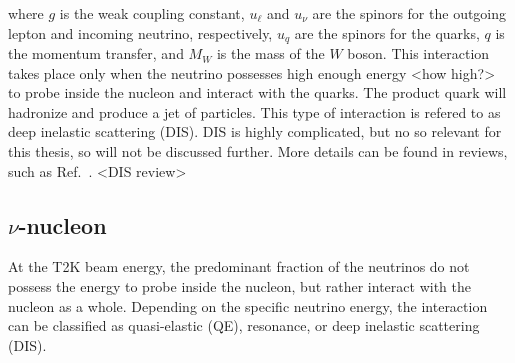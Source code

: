 where $g$ is the weak coupling constant, $u_\ell$ and $u_\nu$ are the spinors for the outgoing lepton and incoming neutrino, respectively, $u_q$ are the spinors for the quarks, $q$ is the momentum transfer, and $M_W$ is the mass of the $W$ boson.
This interaction takes place only when the neutrino possesses high enough energy <how high?> to probe inside the nucleon and interact with the quarks.
The product quark will hadronize and produce a jet of particles.
This type of interaction is refered to as deep inelastic scattering (DIS).
DIS is highly complicated, but no so relevant for this thesis, so will not be discussed further.
More details can be found in reviews, such as Ref.~\cite{}. <DIS review>

\subsection{$\nu$-nucleon}
  At the T2K beam energy, the predominant fraction of the neutrinos do not possess the energy to probe inside the nucleon, but rather interact with the nucleon as a whole.
  Depending on the specific neutrino energy, the interaction can be classified as quasi-elastic (QE), resonance, or deep inelastic scattering (DIS).


